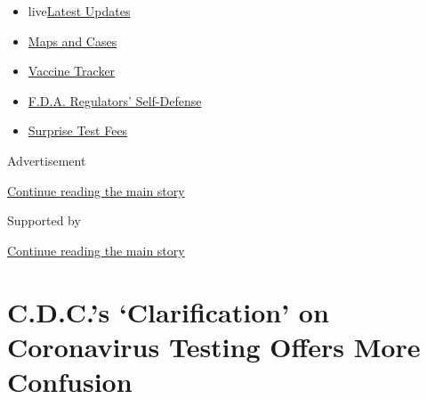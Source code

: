 \begin{itemize}
\tightlist
\item
  live\href{https://www.nytimes3xbfgragh.onion/2020/09/11/world/covid-19-coronavirus.html?name=styln-coronavirus-national\&region=TOP_BANNER\&block=storyline_menu_recirc\&action=click\&pgtype=Article\&impression_id=b6433391-f4ca-11ea-aafb-7b2c4efa9239\&variant=undefined}{Latest
  Updates}
\item
  \href{https://www.nytimes3xbfgragh.onion/interactive/2020/us/coronavirus-us-cases.html?name=styln-coronavirus-national\&region=TOP_BANNER\&block=storyline_menu_recirc\&action=click\&pgtype=Article\&impression_id=b6435aa0-f4ca-11ea-aafb-7b2c4efa9239\&variant=undefined}{Maps
  and Cases}
\item
  \href{https://www.nytimes3xbfgragh.onion/interactive/2020/science/coronavirus-vaccine-tracker.html?name=styln-coronavirus-national\&region=TOP_BANNER\&block=storyline_menu_recirc\&action=click\&pgtype=Article\&impression_id=b6435aa1-f4ca-11ea-aafb-7b2c4efa9239\&variant=undefined}{Vaccine
  Tracker}
\item
  \href{https://www.nytimes3xbfgragh.onion/2020/09/10/us/politics/fda-coronavirus-vaccine.html?name=styln-coronavirus-national\&region=TOP_BANNER\&block=storyline_menu_recirc\&action=click\&pgtype=Article\&impression_id=b6435aa2-f4ca-11ea-aafb-7b2c4efa9239\&variant=undefined}{F.D.A.
  Regulators' Self-Defense}
\item
  \href{https://www.nytimes3xbfgragh.onion/2020/09/09/upshot/coronavirus-surprise-test-fees.html?name=styln-coronavirus-national\&region=TOP_BANNER\&block=storyline_menu_recirc\&action=click\&pgtype=Article\&impression_id=b6435aa3-f4ca-11ea-aafb-7b2c4efa9239\&variant=undefined}{Surprise
  Test Fees}
\end{itemize}

Advertisement

\protect\hyperlink{after-top}{Continue reading the main story}

Supported by

\protect\hyperlink{after-sponsor}{Continue reading the main story}

\hypertarget{cdcs-clarification-on-coronavirus-testing-offers-more-confusion}{%
\section{C.D.C.'s `Clarification' on Coronavirus Testing Offers More
Confusion}\label{cdcs-clarification-on-coronavirus-testing-offers-more-confusion}}

